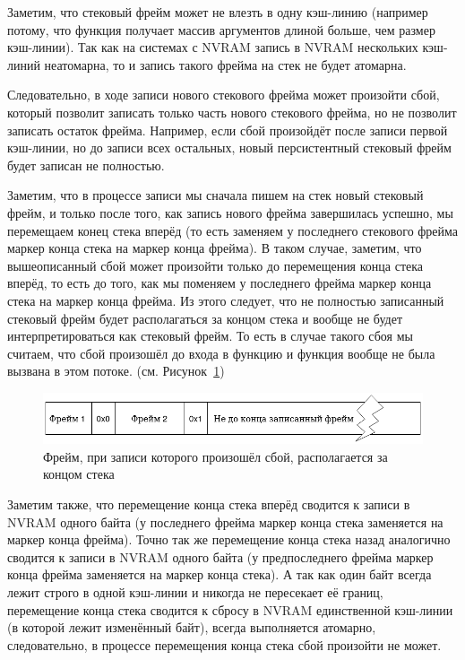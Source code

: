 \documentclass[times,specification,annotation]{itmo-student-thesis}
\begin{document}
Заметим, что стековый фрейм может не влезть в одну кэш-линию (например потому, что функция получает массив аргументов длиной больше, чем размер кэш-линии). Так как на системах с NVRAM запись в NVRAM нескольких кэш-линий неатомарна, то и запись такого фрейма на стек не будет атомарна.

Следовательно, в ходе записи нового стекового фрейма может произойти сбой, который позволит записать только часть нового стекового фрейма, но не позволит записать остаток фрейма. Например, если сбой произойдёт после записи первой кэш-линии, но до записи всех остальных, новый персистентный стековый фрейм будет записан не полностью.

Заметим, что в процессе записи мы сначала пишем на стек новый стековый фрейм, и только после того, как запись нового фрейма завершилась успешно, мы перемещаем конец стека вперёд (то есть заменяем у последнего стекового фрейма маркер конца стека на маркер конца фрейма). В таком случае, заметим, что вышеописанный  сбой может произойти только до перемещения конца стека вперёд, то есть до того, как мы поменяем у последнего фрейма маркер конца стека на маркер конца фрейма. Из этого следует, что не полностью записанный стековый фрейм будет располагаться за концом стека и вообще не будет интерпретироваться как стековый фрейм. То есть в случае такого сбоя мы считаем, что сбой произошёл до входа в функцию и функция вообще не была вызвана в этом потоке. (см. Рисунок~\ref{corrupted-frame-pic})

\begin{figure}[H]
  \centering
  \caption{Фрейм, при записи которого произошёл сбой, располагается за концом стека}
  \label{corrupted-frame-pic}
  \includegraphics[width=\linewidth]{corrupted_frame.png}
\end{figure}

Заметим также, что перемещение конца стека вперёд сводится к записи в NVRAM одного байта (у последнего фрейма маркер конца стека заменяется на маркер конца фрейма). Точно так же перемещение конца стека назад аналогично сводится к записи в NVRAM одного байта (у предпоследнего фрейма маркер конца фрейма заменяется на маркер конца стека). А так как один байт всегда лежит строго в одной кэш-линии и никогда не пересекает её границ, перемещение конца стека сводится к сбросу в NVRAM единственной кэш-линии (в которой лежит изменённый байт), всегда выполняется атомарно, следовательно, в процессе перемещения конца стека сбой произойти не может.
\end{document}

